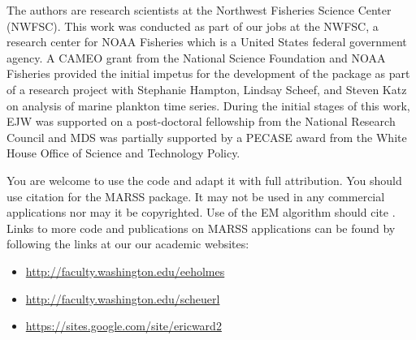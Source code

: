 The authors are research scientists at the Northwest Fisheries Science Center (NWFSC).  This work was conducted as part of our jobs at the NWFSC, a research center for NOAA Fisheries which is a United States federal government agency.   A CAMEO grant from the National Science Foundation and NOAA Fisheries provided the initial impetus for the development of the package as part of a research project with Stephanie Hampton, Lindsay Scheef, and Steven Katz on analysis of marine plankton time series.  During the initial stages of this work, EJW was supported on a post-doctoral fellowship from the National Research Council and MDS was partially supported by a PECASE award from the White House Office of Science and Technology Policy.

You are welcome to use the code and adapt it with full attribution.  You should use citation \citet{Holmesetal2012} for the MARSS package.  It may not be used in any commercial applications nor may it be copyrighted.  Use of the EM algorithm should cite \citet{Holmes2010}. Links to more code and publications on MARSS applications can be found by following the links at our our academic websites:
\begin{itemize}
\item \url{http://faculty.washington.edu/eeholmes}
\item \url{http://faculty.washington.edu/scheuerl}
\item \url{https://sites.google.com/site/ericward2}
\end{itemize}